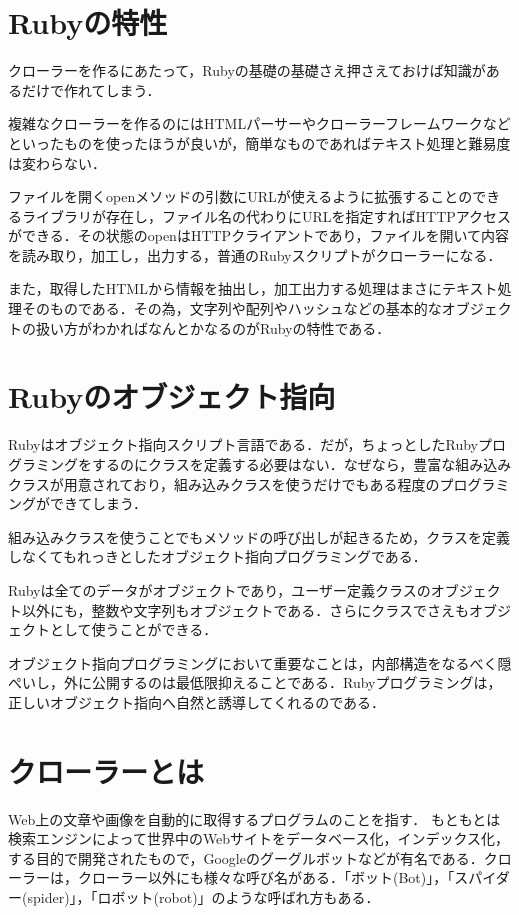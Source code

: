 \section{Rubyの特性}

クローラーを作るにあたって，Rubyの基礎の基礎さえ押さえておけば知識があるだけで作れてしまう．

複雑なクローラーを作るのにはHTMLパーサーやクローラーフレームワークなどといったものを使ったほうが良いが，簡単なものであればテキスト処理と難易度は変わらない．

ファイルを開くopenメソッドの引数にURLが使えるように拡張することのできるライブラリが存在し，ファイル名の代わりにURLを指定すればHTTPアクセスができる．その状態のopenはHTTPクライアントであり，ファイルを開いて内容を読み取り，加工し，出力する，普通のRubyスクリプトがクローラーになる．

また，取得したHTMLから情報を抽出し，加工出力する処理はまさにテキスト処理そのものである．その為，文字列や配列やハッシュなどの基本的なオブジェクトの扱い方がわかればなんとかなるのがRubyの特性である\cite{miyake}．

\section{Rubyのオブジェクト指向}

Rubyはオブジェクト指向スクリプト言語である．だが，ちょっとしたRubyプログラミングをするのにクラスを定義する必要はない．なぜなら，豊富な組み込みクラスが用意されており，組み込みクラスを使うだけでもある程度のプログラミングができてしまう．


組み込みクラスを使うことでもメソッドの呼び出しが起きるため，クラスを定義しなくてもれっきとしたオブジェクト指向プログラミングである．

Rubyは全てのデータがオブジェクトであり，ユーザー定義クラスのオブジェクト以外にも，整数や文字列もオブジェクトである．さらにクラスでさえもオブジェクトとして使うことができる．

オブジェクト指向プログラミングにおいて重要なことは，内部構造をなるべく隠ぺいし，外に公開するのは最低限抑えることである．Rubyプログラミングは，正しいオブジェクト指向へ自然と誘導してくれるのである\cite{miyake}．



\section{クローラーとは}
Web上の文章や画像を自動的に取得するプログラムのことを指す．
もともとは検索エンジンによって世界中のWebサイトをデータベース化，インデックス化，する目的で開発されたもので，Googleのグーグルボットなどが有名である．クローラーは，クローラー以外にも様々な呼び名がある．「ボット(Bot)」，「スパイダー(spider)」，「ロボット(robot)」のような呼ばれ方もある．

